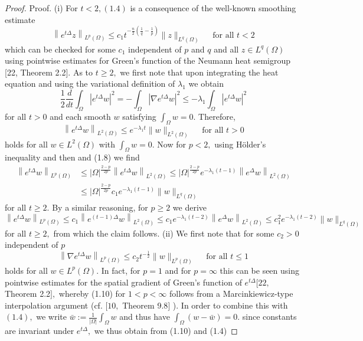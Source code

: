 \begin{proof}
	Proof. (i) For $t<2,(1.4)$ is a consequence of the well-known smoothing estimate
	$$
	\left\|e^{t \Delta} z\right\|_{L^{p}(\Omega)} \leqslant c_{1} t^{-\frac{n}{2}\left(\frac{1}{q}-\frac{1}{p}\right)}\|z\|_{L^{q}(\Omega)} \quad \text { for all } t<2
	$$
	which can be checked for some $c_{1}$ independent of $p$ and $q$ and all $z \in L^{q}(\Omega)$ using pointwise estimates for Green's function of the Neumann heat semigroup [22, Theorem 2.2]. As to $t \geqslant 2,$ we first note that upon integrating the heat equation and using the variational definition of $\lambda_{1}$ we obtain
	$$
	\frac{1}{2} \frac{d}{d t} \int_{\Omega}\left|e^{t \Delta} w\right|^{2}=-\int_{\Omega}\left|\nabla e^{t \Delta} w\right|^{2} \leqslant-\lambda_{1} \int_{\Omega}\left|e^{t \Delta} w\right|^{2}
	$$
	for all $t>0$ and each smooth $w$ satisfying $\int_{\Omega} w=0 .$ Therefore,
	$$
	\left\|e^{t \Delta} w\right\|_{L^{2}(\Omega)} \leqslant e^{-\lambda_{1} t}\|w\|_{L^{2}(\Omega)} \quad \text { for all } t>0
	$$
	holds for all $w \in L^{2}(\Omega)$ with $\int_{\Omega} w=0 .$ Now for $p<2,$ using Hölder's inequality and then and (1.8) we find
	$$
	\begin{aligned}
		\left\|e^{t \Delta} w\right\|_{L^{p}(\Omega)} & \leqslant|\Omega|^{\frac{2-p}{2 p}}\left\|e^{t \Delta} w\right\|_{L^{2}(\Omega)} \leqslant|\Omega|^{\frac{2-p}{2 p}} e^{-\lambda_{1}(t-1)}\left\|e^{\Delta} w\right\|_{L^{2}(\Omega)} \\
		& \leqslant|\Omega|^{\frac{2-p}{2 p}} c_{1} e^{-\lambda_{1}(t-1)}\|w\|_{L^{q}(\Omega)}
	\end{aligned}
	$$
	for all $t \geqslant 2 .$ By a similar reasoning, for $p \geqslant 2$ we derive
	$$
	\left\|e^{t \Delta} w\right\|_{L^{p}(\Omega)} \leqslant c_{1}\left\|e^{(t-1) \Delta} w\right\|_{L^{2}(\Omega)} \leqslant c_{1} e^{-\lambda_{1}(t-2)}\left\|e^{\Delta} w\right\|_{L^{2}(\Omega)} \leqslant c_{1}^{2} e^{-\lambda_{1}(t-2)}\|w\|_{L^{q}(\Omega)}
	$$
	for all $t \geqslant 2,$ from which the claim follows.
	(ii) We first note that for some $c_{2}>0$ independent of $p$
	$$
	\left\|\nabla e^{t \Delta} w\right\|_{L^{p}(\Omega)} \leqslant c_{2} t^{-\frac{1}{2}}\|w\|_{L^{p}(\Omega)} \quad \text { for all } t \leqslant 1
	$$
	holds for all $w \in L^{p}(\Omega) .$ In fact, for $p=1$ and for $p=\infty$ this can be seen using pointwise estimates for the spatial gradient of Green's function of $e^{t \Delta}[22,$ Theorem 2.2$],$ whereby (1.10) for $1<p<\infty$ follows from a Marcinkiewicz-type interpolation argument (cf. $[10,$ Theorem 9.8$]$ ). In order to combine this with $(1.4),$ we write $\bar{w}:=\frac{1}{|\Omega|} \int_{\Omega} w$ and thus have $\int_{\Omega}(w-\bar{w})=0 .$ since constants are invariant under $e^{t \Delta},$ we thus obtain from (1.10) and (1.4)
	

\end{proof}

